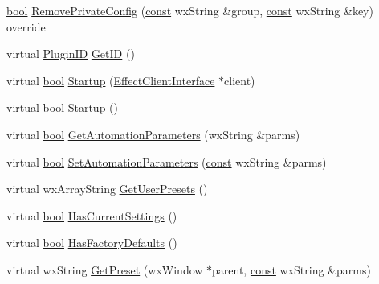 \begin{DoxyCompactItemize}
\item 
\hyperlink{mac_2config_2i386_2lib-src_2libsoxr_2soxr-config_8h_abb452686968e48b67397da5f97445f5b}{bool} \hyperlink{class_effect_ae64fbec4d2680c3304480596f43c3e94}{Remove\+Private\+Config} (\hyperlink{getopt1_8c_a2c212835823e3c54a8ab6d95c652660e}{const} wx\+String \&group, \hyperlink{getopt1_8c_a2c212835823e3c54a8ab6d95c652660e}{const} wx\+String \&key) override
\item 
virtual \hyperlink{include_2audacity_2_types_8h_abe9b737fcebc2b5bea606246e1eab52e}{Plugin\+ID} \hyperlink{class_effect_a5f4201d35ecb530bfbf0d915c5686cdd}{Get\+ID} ()
\item 
virtual \hyperlink{mac_2config_2i386_2lib-src_2libsoxr_2soxr-config_8h_abb452686968e48b67397da5f97445f5b}{bool} \hyperlink{class_effect_ae19dc8fba37cc1694be3de5c3aa91675}{Startup} (\hyperlink{class_effect_client_interface}{Effect\+Client\+Interface} $\ast$client)
\item 
virtual \hyperlink{mac_2config_2i386_2lib-src_2libsoxr_2soxr-config_8h_abb452686968e48b67397da5f97445f5b}{bool} \hyperlink{class_effect_a93585a2dc6d2eee2c1277fd76d2bd4c6}{Startup} ()
\item 
virtual \hyperlink{mac_2config_2i386_2lib-src_2libsoxr_2soxr-config_8h_abb452686968e48b67397da5f97445f5b}{bool} \hyperlink{class_effect_a86b860d82b4299eb5caece0c6fb3eb7b}{Get\+Automation\+Parameters} (wx\+String \&parms)
\item 
virtual \hyperlink{mac_2config_2i386_2lib-src_2libsoxr_2soxr-config_8h_abb452686968e48b67397da5f97445f5b}{bool} \hyperlink{class_effect_a3b67e43f0be61cf2d8025ed7eab7ed38}{Set\+Automation\+Parameters} (\hyperlink{getopt1_8c_a2c212835823e3c54a8ab6d95c652660e}{const} wx\+String \&parms)
\item 
virtual wx\+Array\+String \hyperlink{class_effect_adaf441358264f604791374225240f823}{Get\+User\+Presets} ()
\item 
virtual \hyperlink{mac_2config_2i386_2lib-src_2libsoxr_2soxr-config_8h_abb452686968e48b67397da5f97445f5b}{bool} \hyperlink{class_effect_a05943c4a0907d8bb269bff25311ef276}{Has\+Current\+Settings} ()
\item 
virtual \hyperlink{mac_2config_2i386_2lib-src_2libsoxr_2soxr-config_8h_abb452686968e48b67397da5f97445f5b}{bool} \hyperlink{class_effect_a7bf4a20ce3a422bba007ce57a0353eb4}{Has\+Factory\+Defaults} ()
\item 
virtual wx\+String \hyperlink{class_effect_af370c4459498f00c3d19fe9124cd6ab8}{Get\+Preset} (wx\+Window $\ast$parent, \hyperlink{getopt1_8c_a2c212835823e3c54a8ab6d95c652660e}{const} wx\+String \&parms)

\end{DoxyCompactItemize}
